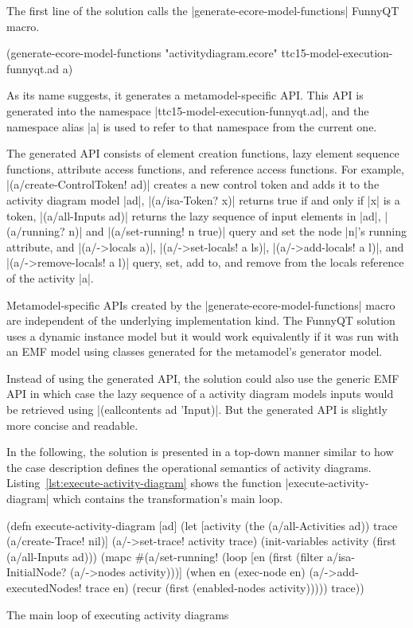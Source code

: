 \documentclass[submission]{eptcs}
\newcommand{\code}{\clojureinline}
\begin{document}
The first line of the solution calls the \code|generate-ecore-model-functions|
FunnyQT macro.

\begin{clojurecode}
(generate-ecore-model-functions "activitydiagram.ecore" ttc15-model-execution-funnyqt.ad a)
\end{clojurecode}

As its name suggests, it generates a metamodel-specific API.  This API is
generated into the namespace \code|ttc15-model-execution-funnyqt.ad|, and the
namespace alias \code|a| is used to refer to that namespace from the current
one.

The generated API consists of element creation functions, lazy element sequence
functions, attribute access functions, and reference access functions.  For
example, \code|(a/create-ControlToken! ad)| creates a new control token and
adds it to the activity diagram model \code|ad|, \code|(a/isa-Token? x)|
returns true if and only if \code|x| is a token, \code|(a/all-Inputs ad)|
returns the lazy sequence of input elements in \code|ad|, \code|(a/running? n)|
and \code|(a/set-running! n true)| query and set the node \code|n|'s
\textsf{running} attribute, and \code|(a/->locals a)|, \code|(a/->set-locals! a
ls)|, \code|(a/->add-locals! a l)|, and \code|(a/->remove-locals! a l)| query,
set, add to, and remove from the \textsf{locals} reference of the activity
\code|a|.

Metamodel-specific APIs created by the \code|generate-ecore-model-functions|
macro are independent of the underlying implementation kind.  The FunnyQT
solution uses a dynamic instance model but it would work equivalently if it was
run with an EMF model using classes generated for the metamodel's generator
model.

Instead of using the generated API, the solution could also use the generic EMF
API in which case the lazy sequence of a activity diagram models inputs would
be retrieved using \code|(eallcontents ad 'Input)|.  But the generated API is
slightly more concise and readable.

\bigskip{}

In the following, the solution is presented in a top-down manner similar to how
the case description defines the operational semantics of activity diagrams.
Listing~\vref{lst:execute-activity-diagram} shows the function
\code|execute-activity-diagram| which contains the transformation's main loop.

\begin{listing}[h!tb]
\begin{clojurecode}
(defn execute-activity-diagram [ad]
  (let [activity (the (a/all-Activities ad))
        trace (a/create-Trace! nil)]
    (a/->set-trace! activity trace)
    (init-variables activity (first (a/all-Inputs ad)))
    (mapc #(a/set-running! %
    (loop [en (first (filter a/isa-InitialNode? (a/->nodes activity)))]
      (when en
        (exec-node en)
        (a/->add-executedNodes! trace en)
        (recur (first (enabled-nodes activity)))))
    trace))
\end{clojurecode}
\caption{The main loop of executing activity diagrams}
\label{lst:execute-activity-diagram}
\end{listing}
\end{document}
